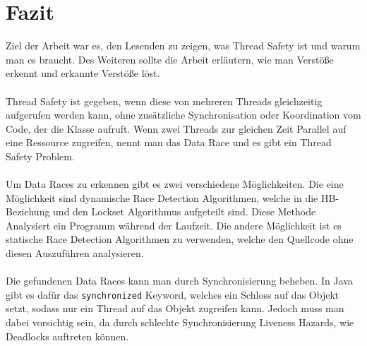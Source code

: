 \section{Fazit}

Ziel der Arbeit war es, den Lesenden zu zeigen, was Thread Safety ist und warum man es braucht. Des Weiteren sollte die Arbeit erläutern, wie man Verstöße erkennt und erkannte Verstöße löst.\\
\\
Thread Safety ist gegeben, wenn diese von mehreren Threads gleichzeitig aufgerufen werden kann, ohne zusätzliche Synchronisation oder Koordination vom Code, der die Klasse aufruft. Wenn zwei Threads zur gleichen Zeit Parallel auf eine Ressource zugreifen, nennt man das Data Race und es gibt ein Thread Safety Problem.\\
\\
Um Data Races zu erkennen gibt es zwei verschiedene Möglichkeiten. Die eine Möglichkeit sind dynamische Race Detection Algorithmen, welche in die \acs{HB}-Beziehung und den Lockset Algorithmus aufgeteilt sind. Diese Methode Analysiert ein Programm während der Laufzeit. Die andere Möglichkeit ist es statische Race Detection Algorithmen zu verwenden, welche den Quellcode ohne diesen Auszuführen analysieren.\\
\\
Die gefundenen Data Races kann man durch Synchronisierung beheben. In Java gibt es dafür das \texttt{synchronized} Keyword, welches ein Schloss auf das Objekt setzt, sodass nur ein Thread auf das Objekt zugreifen kann. Jedoch muss man dabei vorsichtig sein, da durch schlechte Synchronisierung Liveness Hazards, wie Deadlocks auftreten können.